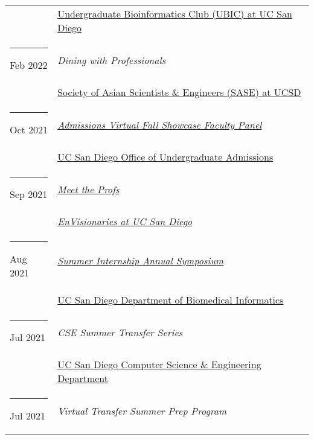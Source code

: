 \documentclass[margin,line]{res}
\begin{document}
\begin{resume}
\begin{longtable}{@{}p{0.7in}p{4in}}
\hspace*{-4mm} & \hspace{4mm} \href{https://ubicucsd.github.io/}{Undergraduate Bioinformatics Club (UBIC) at UC San Diego}\\
\hspace*{-4mm} \rule{-1mm}{5mm} Feb 2022 & \textit{Dining with Professionals}\\*
\hspace*{-4mm} & \hspace{4mm} \href{https://saseatucsd.weebly.com/}{Society of Asian Scientists \& Engineers (SASE) at UCSD}\\
\hspace*{-4mm} \rule{-1mm}{5mm} Oct 2021 & \href{https://beatriton.ucsd.edu/register/ucsdvirtualfallshowcase}{\textit{Admissions Virtual Fall Showcase Faculty Panel}}\\*
\hspace*{-4mm} & \hspace{4mm} \href{https://admissions.ucsd.edu/}{UC San Diego Office of Undergraduate Admissions}\\
\hspace*{-4mm} \rule{-1mm}{5mm} Sep 2021 & \href{https://www.facebook.com/events/610194613335437}{\textit{Meet the Profs}}\\*
\hspace*{-4mm} & \hspace{4mm} \href{https://www.facebook.com/envisionariesUCSD/}{\textit{EnVisionaries at UC San Diego}}\\
\hspace*{-4mm} \rule{-1mm}{5mm} Aug 2021 & \href{https://dbmi.ucsd.edu/education/internships/index.html}{\textit{Summer Internship Annual Symposium}}\\*
\hspace*{-4mm} & \hspace{4mm} \href{https://dbmi.ucsd.edu/}{UC San Diego Department of Biomedical Informatics}\\
\hspace*{-4mm} \rule{-1mm}{5mm} Jul 2021 & \textit{CSE Summer Transfer Series}\\*
\hspace*{-4mm} & \hspace{4mm} \href{https://cse.ucsd.edu/}{UC San Diego Computer Science \& Engineering Department}\\
\hspace*{-4mm} \rule{-1mm}{5mm} Jul 2021 & \textit{Virtual Transfer Summer Prep Program}\\*

\end{longtable}
\end{resume}
\end{document}
